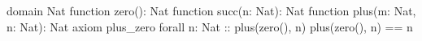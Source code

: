 domain Nat {
    function zero(): Nat
    function succ(n: Nat): Nat
    function plus(m: Nat, n: Nat): Nat
    axiom plus_zero {
        forall n: Nat :: {plus(zero(), n)} plus(zero(), n) == n
    }
}
